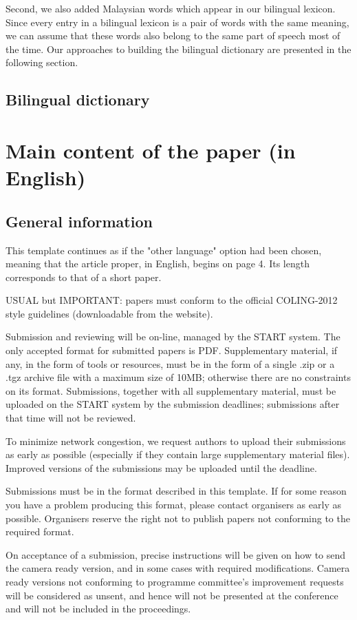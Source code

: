 \documentclass[10pt,a5paper,twoside]{article}
\begin{document}
Second, we also added Malaysian words which appear in our bilingual lexicon. Since every entry in a bilingual lexicon is a pair of words with the same meaning, we can assume that these words also belong to the same part of speech most of the time. Our approaches to building the bilingual dictionary are presented in the following section.

\subsection{Bilingual dictionary}

\section{Main content of the paper (in English)}
\subsection{General information}
This template continues as if the "other language" option had been chosen, meaning that the article proper, in English, begins on page 4. Its length corresponds to that of a short paper.

USUAL but IMPORTANT: papers must conform to the official COLING-2012 style guidelines (downloadable from the website).

Submission and reviewing will be on-line, managed by the START system. The only accepted format for submitted papers is PDF. Supplementary material, if any, in the form of tools or resources, must be in the form of a single .zip or a .tgz archive file with a maximum size of 10MB; otherwise there are no constraints on its format. Submissions, together with all supplementary material, must be uploaded on the START system by the submission deadlines; submissions after that time will not be reviewed.

To minimize network congestion, we request authors to upload their submissions as early as possible (especially if they contain large supplementary material files). Improved versions of the submissions may be uploaded until the deadline.

Submissions must be in the format described in this template. If for some reason you have a problem producing this format, please contact organisers as early as possible. Organisers reserve the right not to publish papers not conforming to the required format.

On acceptance of a submission, precise instructions will be given on how to send the camera ready version, and in some cases with required modifications. Camera ready versions not conforming to programme committee’s improvement requests will be considered as unsent, and hence will not be presented at the conference and will not be included in the proceedings.
\end{document}
